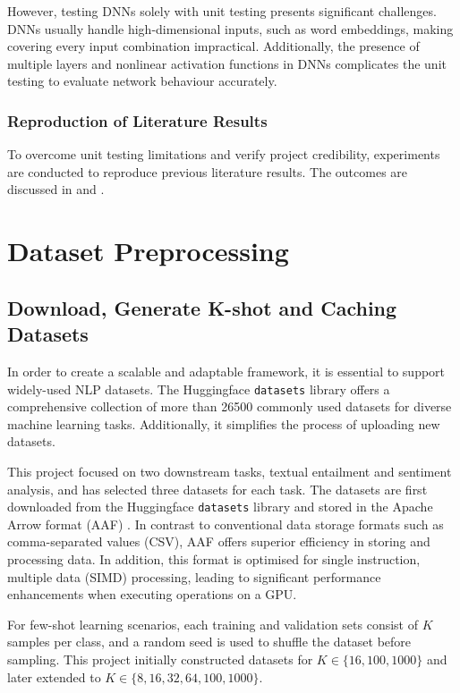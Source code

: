 However, testing DNNs solely with unit testing presents significant challenges. DNNs usually handle high-dimensional inputs, such as word embeddings, making covering every input combination impractical. Additionally, the presence of multiple layers and nonlinear activation functions in DNNs complicates the unit testing to evaluate network behaviour accurately.

\subsubsection{Reproduction of Literature Results}
To overcome unit testing limitations and verify project credibility, experiments are conducted to reproduce previous literature results. The outcomes are discussed in  and .

\section{Dataset Preprocessing}\label{sec:dataset}
\subsection{Download, Generate K-shot and Caching Datasets} \label{sec:dataset-1}
In order to create a scalable and adaptable framework, it is essential to support widely-used NLP datasets. The Huggingface \texttt{datasets} library offers a comprehensive collection of more than 26500 commonly used datasets for diverse machine learning tasks. Additionally, it simplifies the process of uploading new datasets.

This project focused on two downstream tasks, textual entailment and sentiment analysis, and has selected three datasets for each task. The datasets are first downloaded from the Huggingface \texttt{datasets} library and stored in the Apache Arrow format (AAF) \cite{arrow23}. In contrast to conventional data storage formats such as comma-separated values (CSV), AAF offers superior efficiency in storing and processing data. In addition, this format is optimised for single instruction, multiple data (SIMD) processing, leading to significant performance enhancements when executing operations on a GPU. 

For few-shot learning scenarios, each training and validation sets consist of $K$ samples per class, and a random seed is used to shuffle the dataset before sampling. This project initially constructed datasets for $K \in \{16, 100, 1000\}$ and later extended to $K \in \{8, 16, 32, 64, 100, 1000\}$.

